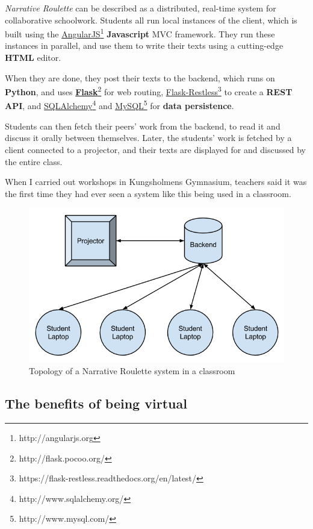 \textit{Narrative Roulette} can be described as a distributed, real-time system for collaborative schoolwork. Students all run local instances of the client, which is built using the \href{http://angularjs.org}{AngularJS}\footnote{http://angularjs.org} \textbf{Javascript} MVC framework. They run these instances in parallel, and use them to write their texts using a cutting-edge \textbf{HTML} editor. 

When they are done, they post their texts to the backend, which runs on \textbf{Python}, and uses \href{http://flask.pocoo.org/}{\textbf{Flask}}\footnote{http://flask.pocoo.org/} for web routing, \href{https://flask-restless.readthedocs.org/en/latest/}{Flask-Restless}\footnote{https://flask-restless.readthedocs.org/en/latest/} to create a \textbf{REST API}, and \href{http://www.sqlalchemy.org/}{SQLAlchemy}\footnote{http://www.sqlalchemy.org/} and \href{http://www.mysql.com/}{MySQL}\footnote{http://www.mysql.com/} for \textbf{data persistence}.

Students can then fetch their peers' work from the backend, to read it and discuss it orally between themselves. Later, the students' work is fetched by a client connected to a projector, and their texts are displayed for and discussed by the entire class.

When I carried out workshops in Kungsholmens Gymnasium, teachers said it was the first time they had ever seen a system like this being used in a classroom\cite{ingulfson}.

\begin{figure}[ht!]
\centering
\includegraphics[width=115mm]{img/NRTopology.png}
\caption{Topology of a Narrative Roulette system in a classroom}
\label{overflow}
\end{figure}

\subsection{The benefits of being virtual}

